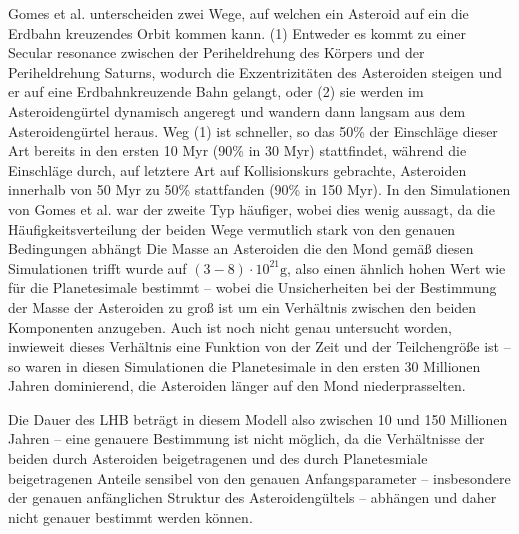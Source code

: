 \documentclass[10pt,a4paper,twoside]{article}
\begin{document}
Gomes et al.\cite{Gomes2005} unterscheiden zwei Wege, auf welchen ein Asteroid auf ein die Erdbahn kreuzendes Orbit kommen kann. (1) Entweder es kommt zu einer Secular resonance zwischen der Periheldrehung des Körpers und der Periheldrehung Saturns, wodurch die Exzentrizitäten des Asteroiden steigen und er auf eine Erdbahnkreuzende Bahn gelangt, oder (2) sie werden im Asteroidengürtel dynamisch angeregt und wandern dann langsam aus dem Asteroidengürtel heraus\cite{Gomes2005}.
Weg (1) ist schneller, so das 50\% der Einschläge dieser Art bereits in den ersten 10 Myr (90\% in 30 Myr) stattfindet, während die Einschläge durch, auf letztere Art auf Kollisionskurs gebrachte, Asteroiden innerhalb von 50 Myr zu 50\% stattfanden (90\% in 150 Myr)\cite{Gomes2005}.
In den Simulationen von Gomes et al. war der zweite Typ häufiger, wobei dies wenig aussagt, da
die Häufigkeitsverteilung der beiden Wege vermutlich stark von den genauen Bedingungen abhängt\cite{Gomes2005} %
Die Masse an Asteroiden die den Mond gemäß diesen Simulationen trifft wurde auf $\left( 3-8 \right) \cdot 10^{21} \mathrm{g}$, %
also einen ähnlich hohen Wert wie für die Planetesimale bestimmt – wobei die Unsicherheiten bei der Bestimmung der Masse der Asteroiden zu groß ist um ein Verhältnis zwischen den beiden Komponenten anzugeben. Auch ist noch nicht genau untersucht worden, inwieweit dieses Verhältnis eine Funktion von der Zeit und der Teilchengröße ist – so waren in diesen Simulationen die Planetesimale in den ersten 30 Millionen Jahren dominierend, die Asteroiden länger auf den Mond niederprasselten\cite{Gomes2005}.

Die Dauer des LHB beträgt in diesem Modell also zwischen 10 und 150 Millionen Jahren – eine genauere Bestimmung ist nicht möglich, da die Verhältnisse der beiden durch Asteroiden beigetragenen und des durch Planetesmiale beigetragenen Anteile sensibel von den genauen Anfangsparameter – insbesondere der genauen anfänglichen Struktur des Asteroidengültels – abhängen und daher nicht genauer bestimmt werden können\cite{Gomes2005}.
\end{document}
